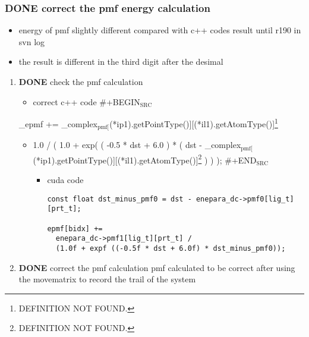 \documentclass[11pt]{article}
\begin{document}
\subsubsection{{\bfseries\sffamily DONE} correct the pmf energy calculation}
\label{sec-2-2-2}
\begin{itemize}
\item energy of pmf slightly different compared with c++ codes result until r190 in svn log
\item the result is different in the third digit after the desimal
\end{itemize}
\begin{enumerate}
\item {\bfseries\sffamily DONE} check the pmf calculation
\label{sec-2-2-2-1}
\begin{itemize}
\item correct c++ code
\#+BEGIN$_{\text{SRC}}$
\end{itemize}
\_epmf += \_complex$_{\text{pmf[}}$(*ip1).getPointType()][(*il1).getAtomType()]\footnote{DEFINITION NOT FOUND.}
\begin{itemize}
\item 1.0 / ( 1.0 + exp( ( -0.5 * dst + 6.0 ) * ( dst - \_complex$_{\text{pmf[}}$(*ip1).getPointType()][(*il1).getAtomType()]\footnote{DEFINITION NOT FOUND.} ) ) );
\#+END$_{\text{SRC}}$
\begin{itemize}
\item cuda code
\begin{verbatim}
const float dst_minus_pmf0 = dst - enepara_dc->pmf0[lig_t][prt_t];

epmf[bidx] +=
  enepara_dc->pmf1[lig_t][prt_t] /
  (1.0f + expf ((-0.5f * dst + 6.0f) * dst_minus_pmf0));
\end{verbatim}
\end{itemize}
\end{itemize}

\item {\bfseries\sffamily DONE} correct the pmf calculation
\label{sec-2-2-2-2}
pmf calculated to be correct after using the movematrix to record the trail of the system
\end{enumerate}
\end{document}
